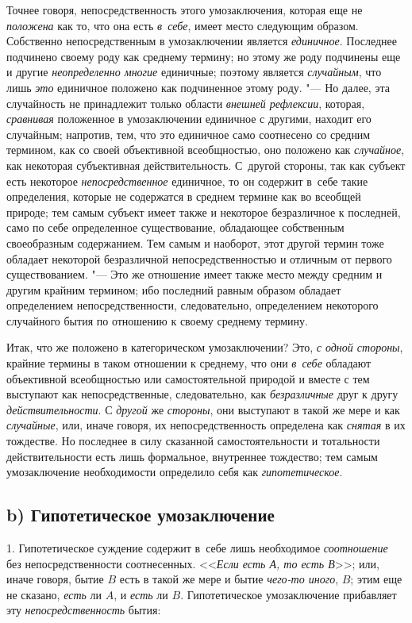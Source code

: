 Точнее говоря, непосредственность этого умозаключения, которая
еще не {\em положена} как
то, что она есть {\em в~себе},
имеет место следующим образом. Собственно непосредственным в
умозаключении является {\em единичное}.
Последнее подчинено своему роду как среднему термину; но
этому же роду подчинены еще и другие
{\em неопределенно многие}
единичные; поэтому является
{\em случайным}, что лишь
{\em это} единичное
положено как подчиненное этому роду. "--- Но далее, эта
случайность не принадлежит только области
{\em внешней рефлексии},
которая, {\em сравнивая}
положенное в умозаключении единичное с другими, находит его
случайным; напротив, тем, что это единичное само соотнесено со средним
термином, как со своей объективной всеобщностью, оно положено как
{\em случайное}, как
некоторая субъективная действительность. С~другой стороны, так как субъект
есть некоторое {\em непосредственное}
единичное, то он содержит в~себе такие определения, которые
не содержатся в среднем термине как во всеобщей природе; тем самым субъект
имеет также и некоторое безразличное к последней, само по себе определенное
существование, обладающее собственным своеобразным
содержанием. Тем самым и наоборот, этот другой
термин
тоже обладает некоторой безразличной непосредственностью и
отличным от первого существованием. "--- Это же отношение имеет
также место между средним и другим крайним термином; ибо последний равным
образом обладает определением непосредственности, следовательно,
определением некоторого случайного бытия по отношению к своему среднему
термину.

Итак, что же положено в категорическом умозаключении? Это,
{\em с одной стороны},
крайние термины в таком отношении к среднему, что они
{\em в~себе} обладают
объективной всеобщностью или самостоятельной природой и вместе с тем
выступают как непосредственные, следовательно, как
{\em безразличные} друг к
другу {\em действительности}.
С {\em другой}
же {\em стороны},
они выступают в такой же мере и как
{\em случайные}, или,
иначе говоря, их непосредственность определена как
{\em снятая} в их
тождестве. Но последнее в силу сказанной самостоятельности и тотальности
действительности есть лишь формальное, внутреннее тождество; тем самым
умозаключение необходимости определило себя как
{\em гипотетическое}.

\subsection[b) Гипотетическое умозаключение]{b) Гипотетическое умозаключение}
1. Гипотетическое суждение содержит в~себе лишь необходимое
{\em соотношение} без непосредственности соотнесенных.
<<{\em Если есть А, то есть В}>>; или, иначе говоря, бытие $B$ есть в такой же
мере и бытие {\em чего-то иного}, $B$; этим еще не сказано, {\em есть} ли
$A$, и {\em есть} ли $B$. Гипотетическое умозаключение прибавляет эту
{\em непосредственность} бытия:

